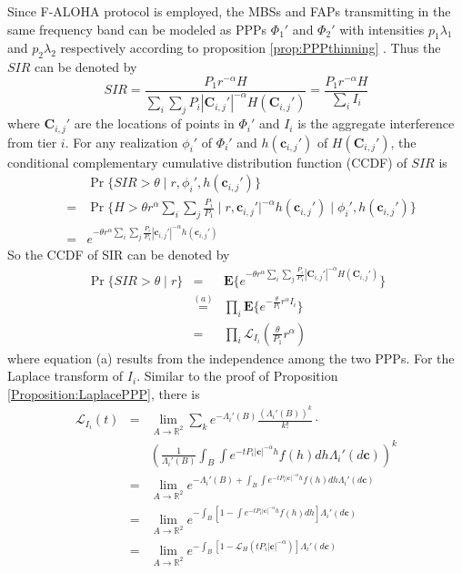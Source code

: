 \documentclass[a4paper,twocolumn]{IEEEtran}
\begin{document}
Since F-ALOHA protocol is employed, the MBSs and FAPs transmitting in the same frequency band can be modeled as PPPs $\Phi_1'$ and $\Phi_2'$ with intensities $p_1\lambda_1$ and $p_2\lambda_2$ respectively according to proposition \ref{prop:PPPthinning} . Thus the $SIR$ can be denoted by
\begin{equation}
SIR = \frac{P_1 r^{-\alpha} H}{\sum_i\sum_j P_i | \bm{C}_{i,j}' |^{-\alpha} H(\bm{C}_{i,j}')}=\frac{P_1 r^{-\alpha} H}{\sum_i I_i}
\end{equation}
where $\bm{C}_{i,j}'$ are the locations of points in $\Phi_i'$ and  $I_i$ is the aggregate interference from tier $i$. For any realization $\phi_i'$ of $\Phi_i'$ and $h(\bm{c}_{i,j}')$ of $H(\bm{C}_{i,j}')$, the conditional complementary cumulative distribution function (CCDF) of $SIR$ is
\begin{eqnarray}
&&\Pr\{SIR > \theta \mid r, \phi_i',h(\bm{c}_{i,j}') \}\nonumber\\
&=& \Pr \{ H > \theta r^{\alpha} {\sum_i\sum_j \frac{P_i}{P_1} \mid r, \bm{c}_{i,j}' |^{-\alpha} h(\bm{c}_{i,j}')} \mid \phi_i',h(\bm{c}_{i,j}') \} \nonumber\\
&=& e^{-\theta r^{\alpha} {\sum_i\sum_j \frac{P_i}{P_1} | \bm{c}_{i,j}' |^{-\alpha} h(\bm{c}_{i,j}')}}
\end{eqnarray}
So the CCDF of SIR can be denoted by
\begin{eqnarray}
\Pr\{SIR > \theta \mid r\}&=&\mathbf{E}\{ e^{-\theta r^{\alpha} {\sum_i\sum_j \frac{P_i}{P_1} | \bm{C}_{i,j}' |^{-\alpha} H(\bm{C}_{i,j}')}} \} \nonumber\\
&\stackrel{(a)}{=}&\prod_{i} \mathbf{E} \{ e^{- \frac{\theta}{P_1} r^{\alpha} I_i} \} \nonumber\\
&=&\prod_{i} \mathcal{L}_{I_i} (\frac{\theta}{P_1} r^{\alpha})
\end{eqnarray}
where equation (a) results from the independence among the two PPPs. For the Laplace transform of $I_i$. Similar to the proof of Proposition \ref{Proposition:LaplacePPP}, there is
\begin{eqnarray}\label{Eq:Lap_Intf}
\mathcal{L}_{I_i} (t) &=&\lim_{A \rightarrow \mathbb{R}^2} \sum_k e^{-\Lambda_i' (B)} \frac{(\Lambda_i' (B))^k}{k!}\cdot \nonumber\\
&&(\frac{1}{\Lambda_i' (B)}\int_{B}\int e^{-t P_i |\bm{c}|^{-\alpha} h}f(h) dh \Lambda_i'(d\bm{c}))^k \nonumber\\
&=&\lim_{A \rightarrow \mathbb{R}^2} e^{-\Lambda_i' (B)+\int_{B}\int e^{-t P_i |\bm{c}|^{-\alpha} h}f(h) dh \Lambda_i'(d\bm{c})}\nonumber\\
&=&\lim_{A \rightarrow \mathbb{R}^2}  e^{-\int_{B}[1-\int e^{-t P_i |\bm{c}|^{-\alpha} h}f(h) dh] \Lambda_i'(d\bm{c})}\nonumber\\
&=&\lim_{A \rightarrow \mathbb{R}^2}  e^{-\int_{B}[1-\mathcal{L}_H (t P_i |\bm{c}|^{-\alpha})] \Lambda_i'(d\bm{c})}
\end{eqnarray}
\end{document}
